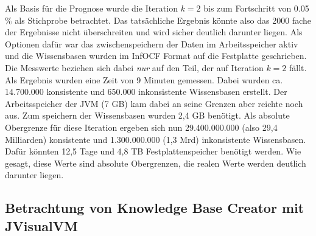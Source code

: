 \documentclass[12pt,a4paper]{article}
\begin{document}
Als Basis für die Prognose wurde die Iteration $k=2$ bis zum Fortschritt von 0.05 $\%$ als Stichprobe betrachtet. Das tatsächliche Ergebnis könnte also das 2000 fache der Ergebnisse nicht überschreiten und wird sicher deutlich darunter liegen. Als Optionen dafür war das zwischenspeichern der Daten im Arbeitsspeicher aktiv und die Wissensbasen wurden im InfOCF Format auf die Festplatte geschrieben. Die Messwerte beziehen sich dabei \textit{nur} auf den Teil, der auf Iteration $k=2$ fällt. Als Ergebnis wurden eine Zeit von 9 Minuten gemessen. Dabei wurden ca. 14.700.000 konsistente und 650.000 inkonsistente Wissensbasen erstellt. Der Arbeitsspeicher der JVM (7 GB) kam dabei an seine Grenzen aber reichte noch aus. Zum speichern der Wissensbasen wurden 2,4 GB benötigt. Als absolute Obergrenze für diese Iteration ergeben sich nun 29.400.000.000 (also 29,4 Milliarden) konsistente und 1.300.000.000 (1,3 Mrd) inkonsistente Wissensbasen. Dafür könnten 12,5 Tage und 4,8 TB Festplattenspeicher benötigt werden. Wie gesagt, diese Werte sind absolute Obergrenzen, die realen Werte werden deutlich darunter liegen.


\subsection{Betrachtung von Knowledge Base Creator mit JVisualVM}
\end{document}

